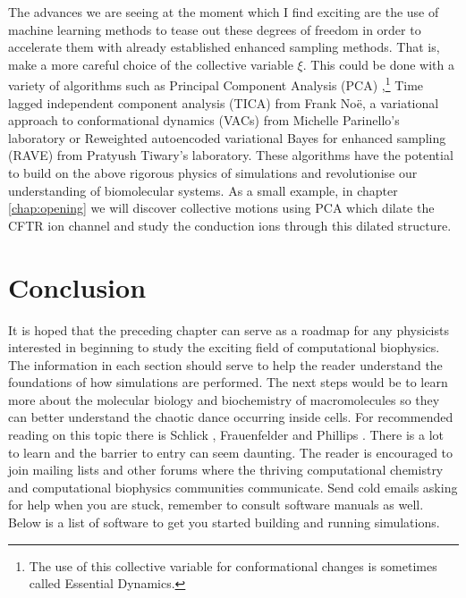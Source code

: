 The advances we are seeing at the moment which I find exciting are the use of machine learning methods to tease out these degrees of freedom in order to accelerate them with already established enhanced sampling methods. That is, make a more careful choice of the collective variable $\xi$. This could be done with a variety of algorithms such as Principal Component Analysis (PCA) \cite{spiwok2007},\footnote{The use of this collective variable for conformational changes is sometimes called Essential Dynamics.} Time lagged independent component analysis (TICA) \cite{noe2001, schultze2021} from Frank No\"e, a variational approach to conformational dynamics (VACs) from Michelle Parinello's laboratory \cite{brotzakis2019} or Reweighted autoencoded variational Bayes for enhanced sampling (RAVE) \cite{ribeiro2018} from Pratyush Tiwary's laboratory. These algorithms have the potential to build on the above rigorous physics of simulations and revolutionise our understanding of biomolecular systems. As a small example, in chapter \ref{chap:opening} we will discover collective motions using PCA which dilate the CFTR ion channel and study the conduction ions through this dilated structure. 

\section{Conclusion}
It is hoped that the preceding chapter can serve as a roadmap for any physicists interested in beginning to study the exciting field of computational biophysics. The information in each section should serve to help the reader understand the foundations of how simulations are performed. The next steps would be to learn more about the molecular biology and biochemistry of macromolecules so they can better understand the chaotic dance occurring inside cells. For recommended reading on this topic there is Schlick \cite{schlick2010}, Frauenfelder \cite{frauenfelder2010} and Phillips \cite{phillips2012}. There is a lot to learn and the barrier to entry can seem daunting. The reader is encouraged to join mailing lists and other forums where the thriving computational chemistry and computational biophysics communities communicate. Send cold emails asking for help when you are stuck, remember to consult software manuals as well. Below is a list of software to get you started building and running simulations. 


